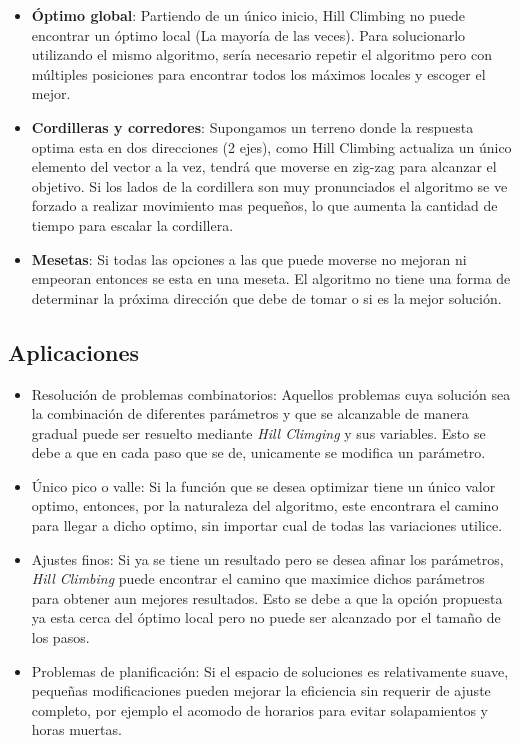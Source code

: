 \documentclass[12pt,twoside]{article}
\begin{document}
	\begin{itemize}
		\item \textbf{Óptimo global}: Partiendo de un único inicio, Hill Climbing no puede encontrar un óptimo local (La mayoría de las veces). Para solucionarlo utilizando el mismo algoritmo, sería necesario repetir el algoritmo pero con múltiples posiciones para encontrar todos los máximos locales y escoger el mejor.
		
		\item \textbf{Cordilleras y corredores}: Supongamos un terreno donde la respuesta optima esta en dos direcciones (2 ejes), como Hill Climbing actualiza un único elemento del vector a la vez, tendrá que moverse en zig-zag para alcanzar el objetivo.  Si los lados de la cordillera son muy pronunciados el algoritmo se ve forzado a realizar movimiento mas pequeños, lo que aumenta la cantidad de tiempo para escalar la cordillera.
		
		\item \textbf{Mesetas}: Si todas las opciones a las que puede moverse no mejoran ni empeoran entonces se esta en una meseta. El algoritmo no tiene una forma de determinar la próxima dirección que debe de tomar o si es la mejor solución. 
	\end{itemize}

	\subsection{Aplicaciones}

	\begin{itemize}
		\item Resolución de problemas combinatorios: Aquellos problemas cuya solución sea la combinación de diferentes parámetros y que se alcanzable de manera gradual puede ser resuelto mediante \textit{Hill Climging} y sus variables. Esto se debe a que en cada paso que se de, unicamente se modifica un parámetro.
		
		\item Único pico o valle: Si la función que se desea optimizar tiene un único valor optimo, entonces, por la naturaleza del algoritmo,  este encontrara el camino para llegar a dicho optimo, sin importar cual de todas las variaciones utilice.
		
		\item Ajustes finos: Si ya se tiene un resultado pero se desea afinar los parámetros, \textit{Hill Climbing} puede encontrar el camino que maximice dichos parámetros para obtener aun mejores resultados. Esto se debe a que la opción propuesta ya esta cerca del óptimo local pero no puede ser alcanzado por el tamaño de los pasos.
		
		\item Problemas de planificación: Si el espacio de soluciones es relativamente suave, pequeñas modificaciones pueden mejorar la eficiencia sin requerir de ajuste completo, por ejemplo  el acomodo de horarios para evitar solapamientos y horas muertas.
	\end{itemize}
\end{document}
